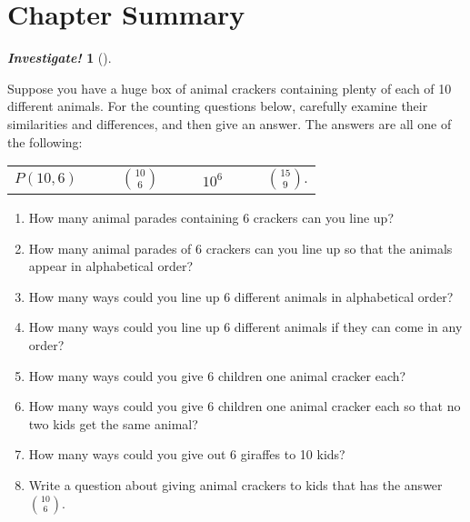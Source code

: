 \documentclass[10pt,]{book}
\theoremstyle{plain}
\theoremstyle{definition}
\theoremstyle{definition}
\newtheorem{investigation}[project]{\emph{Investigate!}}
\theoremstyle{definition}
\numberwithin{equation}{chapter}
\begin{document}
\section[Chapter Summary]{Chapter Summary}\label{sec_count-conc}
\begin{investigation}[]\label{investigation-14}

        Suppose you have a huge box of animal crackers containing plenty of each of 10 different animals. For the counting questions below, carefully examine their similarities and differences, and then give an answer. The answers are all one of the following:
        \leavevmode%
\begin{table}
\centering
\begin{tabular}{llll}
\(P(10,6)\qquad\)&\({10 \choose 6}\qquad\)&\(10^6\qquad\)&\({15 \choose 9}.\)
\end{tabular}
\end{table}

        \leavevmode%
\begin{enumerate}
\item\hypertarget{li-645}{}
              How many animal parades containing 6 crackers can you line up?
\item\hypertarget{li-646}{}
              How many animal parades of 6 crackers can you line up so that the animals appear in alphabetical order?
\item\hypertarget{li-647}{}
              How many ways could you line up 6 different animals in alphabetical order?
\item\hypertarget{li-648}{}
              How many ways could you line up 6 different animals if they can come in any order?
\item\hypertarget{li-649}{}
              How many ways could you give 6 children one animal cracker each?
\item\hypertarget{li-650}{}
              How many ways could you give 6 children one animal cracker each so that no two kids get the same animal?
\item\hypertarget{li-651}{}
              How many ways could you give out 6 giraffes to 10 kids?
\item\hypertarget{li-652}{}
              Write a question about giving animal crackers to kids that has the answer \({10\choose 6}\).
\end{enumerate}

\end{investigation}
\end{document}
